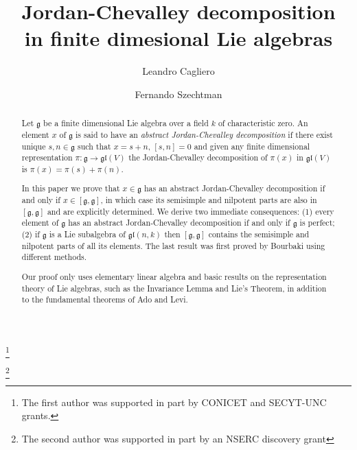 \documentclass{amsart}
\theoremstyle{definition}
\theoremstyle{remark}
\numberwithin{equation}{section}
\newcommand \g{{\mathfrak g}}
\newcommand \gl{{\mathfrak {gl}}}
\begin{document}
\title{Jordan-Chevalley decomposition\\ in finite dimesional Lie algebras}

\author{Leandro Cagliero}
\address{CIEM-CONICET, FAMAF-Universidad Nacional de C\'ordoba, C\'ordoba, Argentina.}
\thanks{The first author was supported in part by CONICET and SECYT-UNC grants.}

\author{Fernando Szechtman}
\address{Department of Mathematics and Statistics, Univeristy of Regina, Canada}
\thanks{The second author was supported in part by an NSERC discovery grant}





\begin{abstract}
Let $\g$ be a finite dimensional Lie algebra over
a field $k$ of characteristic zero.
An element $x$ of $\g$ is said to have an \emph{abstract Jordan-Chevalley decomposition}
if there exist unique $s,n\in\g$ such that $x=s+n$, $[s,n]=0$ and given any
finite dimensional representation $\pi:\g\to\gl(V)$
the Jordan-Chevalley decomposition of $\pi(x)$ in $\gl(V)$ is $\pi(x)=\pi(s)+\pi(n)$.


In this paper we prove that $x\in\g$ has an abstract Jordan-Chevalley decomposition
if and only if $x\in [\g,\g]$, in which case its semisimple and nilpotent parts are
also in $[\g,\g]$ and are explicitly determined. We derive two immediate consequences:
(1) every element of $\g$ has an abstract Jordan-Chevalley decomposition if and only if
$\g$ is perfect; (2) if $\g$ is a Lie subalgebra of $\gl(n,k)$ then
$[\g,\g]$ contains the semisimple and nilpotent parts of
all its elements. The last result was first proved by Bourbaki using different methods.

Our proof only uses
elementary linear algebra and basic results on the representation theory
of Lie algebras, such as the Invariance Lemma and Lie's Theorem,
in addition to the fundamental theorems of Ado and Levi.
\end{abstract}
\end{document}
